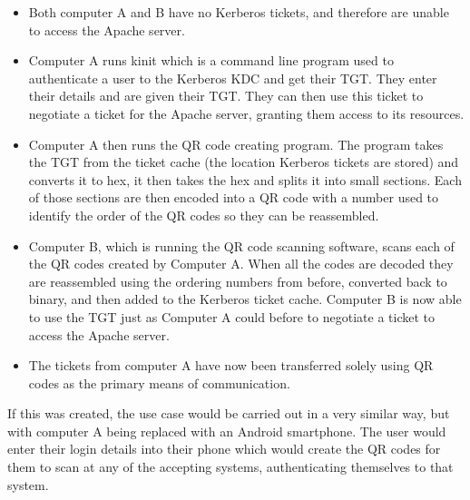 \documentclass[]{report}   %
\begin{document}
\begin{itemize}
	\item Both computer A and B have no Kerberos tickets, and therefore are unable to access the Apache server.
	\item Computer A runs kinit which is a command line program used to authenticate a user to the Kerberos KDC and get their TGT. They enter their details and are given their TGT. They can then use this ticket to negotiate a ticket for the Apache server, granting them access to its resources.
	\item Computer A then runs the QR code creating program. The program takes the TGT from the ticket cache (the location Kerberos tickets are stored) and converts it to hex, it then takes the hex and splits it into small sections. Each of those sections are then encoded into a QR code with a number used to identify the order of the QR codes so they can be reassembled. 
	\item Computer B, which is running the QR code scanning software, scans each of the QR codes created by Computer A. When all the codes are decoded they are reassembled using the ordering numbers from before, converted back to binary, and then added to the Kerberos ticket cache. Computer B is now able to use the TGT just as Computer A could before to negotiate a ticket to access the Apache server.
	\item The tickets from computer A have now been transferred solely using QR codes as the primary means of communication.
\end{itemize}

If this was created, the use case would be carried out in a very similar way, but with computer A being replaced with an Android smartphone. The user would enter their login details into their phone which would create the QR codes for them to scan at any of the accepting systems, authenticating themselves to that system.
\end{document}
